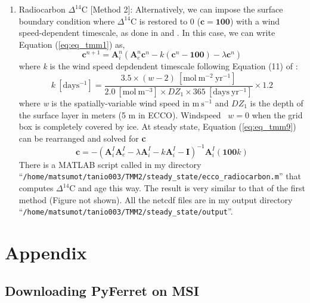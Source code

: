 \documentclass[a4paper]{article}
\begin{document}
\begin{enumerate}[label=(\arabic*)]
\item Radiocarbon $\Delta^{14}\mathrm{C}$ [Method 2]: Alternatively, we can impose the surface boundary condition where $\Delta^{14}\mathrm{C}$ is restored to 0 ($\mathbf{c} = \mathbf{100} $) with a wind speed-dependent timescale, as done in \cite{Khatiwala05} and \cite{Khatiwala07}. In this case, we can write Equation (\ref{eq:eq_tmm1}) as, 
\begin{equation}
   \mathbf{c}^{n+1}= \mathbf{A}_i^{n}(\mathbf{A}_e^{n}\mathbf{c}^{n} -k(\mathbf{c}^{n}-\mathbf{100}) - \lambda\mathbf{c}^{n})   \label{eq:eq_tmm9}
\end{equation}
where \textit{k} is the wind speed depdendent timescale following Equation (11) of \cite{Toggweiler89}:
\begin{equation}
   k \ [\mathrm{days^{-1}}]= \frac{3.5\times(w-2) \ [\mathrm{mol\ m^{-2} \ yr^{-1}}]}{2.0 \ [\mathrm{mol\ m^{-3} }]\times DZ_1 \times 365 \ [\mathrm{days\ yr^{-1} }]  }\times 1.2   \label{eq:eq_tmm10}
\end{equation}
where \textit{w} is the spatially-variable wind speed in $\mathrm{m \ s^{-1}}$ and $DZ_1$ is the depth of the surface layer in meters (5 m in ECCO). Windspeed \ $w = 0$ when the grid box is completely covered by ice. At steady state, Equation (\ref{eq:eq_tmm9}) can be rearranged and solved for \textbf{c} 
\begin{equation}
   \mathbf{c} = -(\mathbf{A}_i^{I}\mathbf{A}_e^{I}-\lambda\mathbf{A}_i^{I}- k\mathbf{A}_i^{I}- \mathbf{I})^{-1}\mathbf{A}_i^{I}(\mathbf{100}k)   \label{eq:eq_tmm11}
\end{equation}
There is a MATLAB script called in my directory \\ ``\verb|/home/matsumot/tanio003/TMM2/steady_state/ecco_radiocarbon.m|'' that computes $\Delta^{14}\mathrm{C}$ and age this way. The result is very similar to that of the first method (Figure not shown). All the netcdf files are in my output directory ``\verb|/home/matsumot/tanio003/TMM2/steady_state/output|''.
 
\end{enumerate}



\section{Appendix}

\subsection{Downloading PyFerret on MSI}
\end{document}
